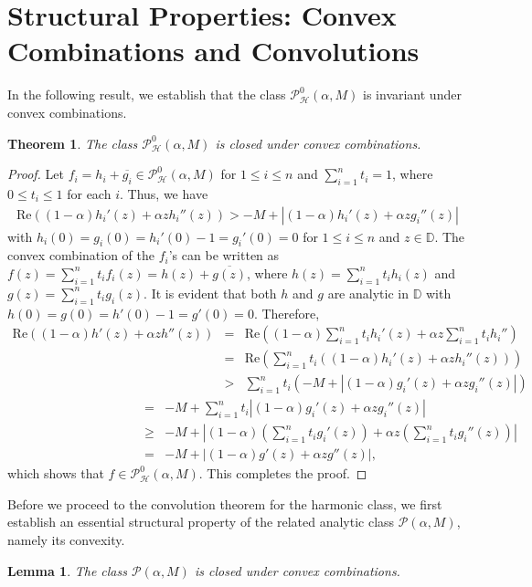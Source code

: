 \documentclass[11pt,reqno]{amsart}
\newtheorem{theo}{Theorem}[section]
\newtheorem{lem}{Lemma}[section]
\newtheorem{open problem}{Open problem}[section]
\newcommand{\ol}{\overline}
\newcommand{\beas}{\begin{eqnarray*}}
\newcommand{\eeas}{\end{eqnarray*}}
\numberwithin{equation}{section}
\begin{document}
\section{Structural Properties: Convex Combinations and Convolutions}
\noindent In the following result, we establish that the class $\mathcal{P}_{\mathcal{H}}^0(\alpha,M)$ is invariant under convex combinations.
\begin{theo}\label{T5} The class $\mathcal{P}_{\mathcal{H}}^0(\alpha,M)$ is closed under convex combinations.\end{theo}
\begin{proof} Let $f_i=h_i+\ol{g_i}\in\mathcal{P}_{\mathcal{H}}^0(\alpha,M)$ for $1\leq i\leq n$ and $\sum_{i=1}^n t_i=1$, where $0\leq t_i\leq 1$ for each $i$. Thus, we have 
\beas \text{Re}\left((1-\alpha)h_i'(z)+ \alpha zh_i''(z)\right)>-M+\left|(1-\alpha)h_i'(z)+\alpha zg_i''(z)\right|\eeas
with $h_i(0)=g_i(0)=h_i'(0)-1=g_i'(0)=0$ for $1\leq i\leq n$ and $z\in\mathbb{D}$.
The convex combination of the $f_i$'s can be written as $f(z)=\sum_{i=1}^n t_if_i(z)=h(z)+\ol{g(z)}$,
where $h(z)=\sum_{i=1}^n t_i h_i(z)$ and $g(z)=\sum_{i=1}^n t_ig_i(z)$. It is evident that both $h$ and $g$ are analytic in $\mathbb{D}$ with $h(0)=g(0)=h'(0)-1=g'(0)=0$.
Therefore,
\beas \text{Re}\left((1-\alpha)h'(z)+ \alpha zh''(z)\right)&=&\text{Re}\left((1-\alpha)\sum_{i=1}^n t_i h_i'(z)+\alpha z\sum_{i=1}^nt_ih_i''\right)\hspace{2cm}\\[2mm]
&=&\text{Re}\left(\sum_{i=1}^n t_i\left((1-\alpha)h_i'(z)+ \alpha zh_i''(z)\right)\right)\\[1mm]
&>&\sum_{i=1}^nt_i \left(-M+\left|(1-\alpha)g_i'(z)+\alpha zg_i''(z)\right|\right)\eeas
\beas\hspace{4cm}&=&-M+\sum_{i=1}^nt_i\left|(1-\alpha)g_i'(z)+\alpha zg_i''(z)\right| \\[1mm]
&\geq&-M+\left|(1-\alpha)\left(\sum_{i=1}^nt_ig_i'(z)\right)+\alpha z\left(\sum_{i=1}^nt_i g_i''(z)\right)\right|\\[1mm]
&=& -M+\left|(1-\alpha)g'(z)+\alpha zg''(z)\right|,\eeas
which shows that $f\in\mathcal{P}_{\mathcal{H}}^0(\alpha,M)$. This completes the proof.\end{proof}
\noindent Before we proceed to the convolution theorem for the harmonic class, we first establish an essential structural property of the related analytic class $\mathcal{P}(\alpha, M)$, namely its convexity.
\begin{lem}\label{lem1}
The class \(\mathcal{P}(\alpha, M)\) is closed under convex combinations.
\end{lem}
\end{document}

